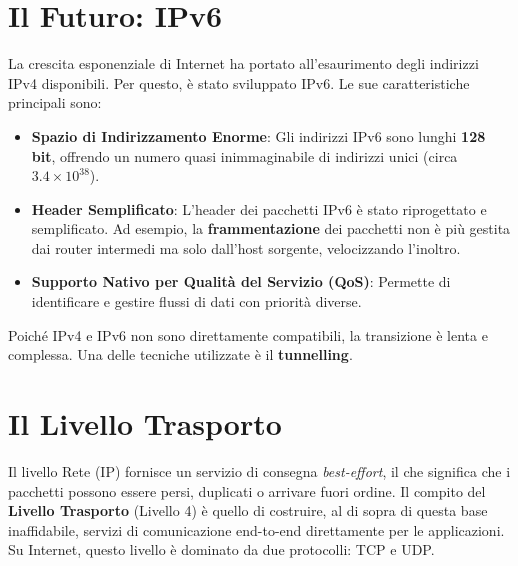\section{Il Futuro: IPv6}
La crescita esponenziale di Internet ha portato all'esaurimento degli indirizzi IPv4 disponibili. Per questo, è stato sviluppato IPv6.
Le sue caratteristiche principali sono:
\begin{itemize}
    \item \textbf{Spazio di Indirizzamento Enorme}: Gli indirizzi IPv6 sono lunghi \textbf{128 bit}, offrendo un numero quasi inimmaginabile di indirizzi unici (circa $3.4 \times 10^{38}$).
    \item \textbf{Header Semplificato}: L'header dei pacchetti IPv6 è stato riprogettato e semplificato. Ad esempio, la \textbf{frammentazione} dei pacchetti non è più gestita dai router intermedi ma solo dall'host sorgente, velocizzando l'inoltro.
    \item \textbf{Supporto Nativo per Qualità del Servizio (QoS)}: Permette di identificare e gestire flussi di dati con priorità diverse.
\end{itemize}
Poiché IPv4 e IPv6 non sono direttamente compatibili, la transizione è lenta e complessa. Una delle tecniche utilizzate è il \textbf{tunnelling}.


\section{Il Livello Trasporto}
Il livello Rete (IP) fornisce un servizio di consegna \textit{best-effort}, il che significa che i pacchetti possono essere persi, duplicati o arrivare fuori ordine. Il compito del \textbf{Livello Trasporto} (Livello 4) è quello di costruire, al di sopra di questa base inaffidabile, servizi di comunicazione end-to-end direttamente per le applicazioni. Su Internet, questo livello è dominato da due protocolli: TCP e UDP.

